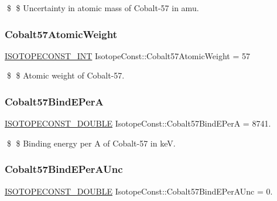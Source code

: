 \$ \$ Uncertainty in atomic mass of Cobalt-\/57 in amu. \mbox{\label{group___isotope_const-_cobalt-_co57_gaead28edadef46c2ac4f55f1cf5341ceb}} 
\subsubsection{\texorpdfstring{Cobalt57\+Atomic\+Weight}{Cobalt57AtomicWeight}}
{\footnotesize\ttfamily \mbox{\hyperlink{group___isotope_const-_macros_ga5f18360b3e99483a35c32d789e62621c}{I\+S\+O\+T\+O\+P\+E\+C\+O\+N\+S\+T\+\_\+\+I\+NT}} Isotope\+Const\+::\+Cobalt57\+Atomic\+Weight = 57}

\$ \$ Atomic weight of Cobalt-\/57. \mbox{\label{group___isotope_const-_cobalt-_co57_ga9387a90246b617ee416653e8ad1910b0}} 
\subsubsection{\texorpdfstring{Cobalt57\+Bind\+E\+PerA}{Cobalt57BindEPerA}}
{\footnotesize\ttfamily \mbox{\hyperlink{group___isotope_const-_macros_ga8f45a7272ce02c0b4c65c44636ed719a}{I\+S\+O\+T\+O\+P\+E\+C\+O\+N\+S\+T\+\_\+\+D\+O\+U\+B\+LE}} Isotope\+Const\+::\+Cobalt57\+Bind\+E\+PerA = 8741.}

\$ \$ Binding energy per A of Cobalt-\/57 in keV. \mbox{\label{group___isotope_const-_cobalt-_co57_gabc8e98aeb045354575142ae0f7127dcc}} 
\subsubsection{\texorpdfstring{Cobalt57\+Bind\+E\+Per\+A\+Unc}{Cobalt57BindEPerAUnc}}
{\footnotesize\ttfamily \mbox{\hyperlink{group___isotope_const-_macros_ga8f45a7272ce02c0b4c65c44636ed719a}{I\+S\+O\+T\+O\+P\+E\+C\+O\+N\+S\+T\+\_\+\+D\+O\+U\+B\+LE}} Isotope\+Const\+::\+Cobalt57\+Bind\+E\+Per\+A\+Unc = 0.}

